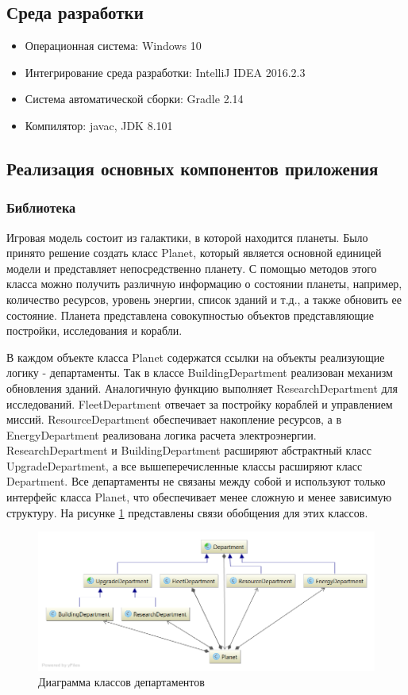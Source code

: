 \subsection{Среда разработки}

\begin{itemize}
	\item Операционная система: Windows 10
	\item Интегрирование среда разработки: IntelliJ IDEA 2016.2.3
	\item Система автоматической сборки: Gradle 2.14
	\item Компилятор: javac, JDK 8.101
\end{itemize}

\subsection{Реализация основных компонентов приложения}

\subsubsection{Библиотека}

Игровая модель состоит из галактики, в которой находится планеты. Было принято решение создать класс Planet, который является основной единицей модели и представляет непосредственно планету. С помощью методов этого класса можно получить различную информацию о состоянии планеты, например, количество ресурсов, уровень энергии, список зданий и т.д., а также обновить ее состояние. Планета представлена совокупностью объектов представляющие постройки, исследования и корабли.

В каждом объекте класса Planet содержатся ссылки на объекты реализующие логику - департаменты. Так в классе BuildingDepartment реализован механизм обновления зданий. Аналогичную функцию выполняет ResearchDepartment для исследований. FleetDepartment отвечает за постройку кораблей и управлением миссий. ResourceDepartment обеспечивает накопление ресурсов, а в EnergyDepartment  реализована логика расчета электроэнергии. ResearchDepartment и BuildingDepartment расширяют абстрактный класс UpgradeDepartment, а все вышеперечисленные классы расширяют класс Department. Все департаменты не связаны между собой и используют только интерфейс класса Planet, что обеспечивает менее сложную и менее зависимую структуру. На рисунке \ref{pic:d1} представлены связи обобщения для этих классов.

\begin{figure}[H]
\centering
\includegraphics[scale=0.5]{diagram3.png}
\caption{Диаграмма классов  департаментов}
\label{pic:d1}
\end{figure}

